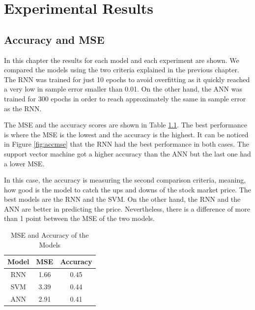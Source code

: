 \chapter{Experimental Results}
\label{ch:expResults}

\section{Accuracy and MSE}
In this chapter the results for each model and each experiment are shown. We compared the models using the two criteria explained in the previous chapter. The RNN was trained for just 10 epochs to avoid overfitting as it quickly reached a very low in sample error smaller than 0.01. On the other hand, the ANN was trained for 300 epochs in order to reach approximately the same in sample error as the RNN. 


The MSE and the accuracy scores are shown in Table \ref{table:accmse}. The best performance is where the MSE is the lowest and the accuracy is the highest. It can be noticed in Figure \ref{fig:accmse} that the RNN had the best performance in both cases. The support vector machine got a higher accuracy than the ANN but the last one had a lower MSE.

In this case, the accuracy is measuring the second comparison criteria, meaning, how good is the model to catch the ups and downs of the stock market price. The best models are the RNN and the SVM. On the other hand, the RNN and the ANN are better in predicting the price. Nevertheless, there is a difference of more than 1 point between the MSE of the two models.  

\begin{table}{}
\begin{center}
\begin{tabular}{ c | c | c }
    \hline
     \textbf{Model} &  \textbf{MSE} &    \textbf{Accuracy}\\ \hline
    RNN&  1.66&  0.45 \\ \hline
    SVM&  3.39&  0.44\\ \hline
    ANN&  2.91&  0.41\\ \hline
      \hline
  \end{tabular}
  \caption{MSE and Accuracy of the Models}
 \label{table:accmse}
\end{center}
 \end{table}

